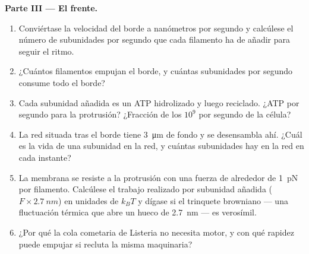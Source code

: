 \begin{problem}
\medskip
\noindent\textbf{Parte III --- El frente.}
\begin{enumerate}[resume]
  \item Conviértase la velocidad del borde a nanómetros por segundo y
        calcúlese el número de subunidades por segundo que cada filamento
        ha de añadir para seguir el ritmo.
  \item ¿Cuántos filamentos empujan el borde, y cuántas subunidades por
        segundo consume todo el borde?
  \item Cada subunidad añadida es un ATP hidrolizado y luego reciclado.
        ¿ATP por segundo para la protrusión? ¿Fracción de los $10^{9}$
        por segundo de la célula?
  \item La red situada tras el borde tiene \qty{3}{\micro m} de fondo y
        se desensambla ahí. ¿Cuál es la vida de una subunidad en la red,
        y cuántas subunidades hay en la red en cada instante?
  \item La membrana se resiste a la protrusión con una fuerza de
        alrededor de \qty{1}{pN} por filamento. Calcúlese el trabajo
        realizado por subunidad añadida ($F\times \qty{2.7}{nm}$) en
        unidades de $k_{B}T$ y dígase si el trinquete browniano --- una
        fluctuación térmica que abre un hueco de \qty{2.7}{nm} --- es
        verosímil.
  \item ¿Por qué la cola cometaria de Listeria no necesita motor, y con
        qué rapidez puede empujar si recluta la misma maquinaria?
\end{enumerate}


\end{problem}
